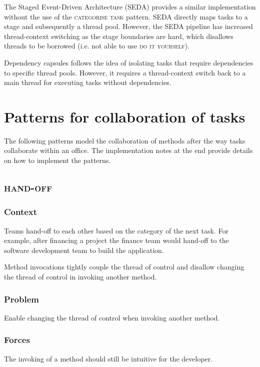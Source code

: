\documentclass[prodmode]{style/acmlarge}
\begin{document}
The Staged Event-Driven Architecture (SEDA) \cite{seda} provides a similar
implementation without the use of the \textsc{categorise task} pattern.
SEDA directly maps tasks to a stage and subsequently a thread pool.
However, the SEDA pipeline has increased thread-context switching as the stage
boundaries are hard, which disallows threads to be borrowed (i.e. not able to
use \textsc{do it yourself}).

Dependency capsules \cite{dependency-capsules} follows the idea of isolating
tasks that require dependencies to specific thread pools.  However, it
requires a thread-context switch back to a main thread for executing tasks
without dependencies.



\section{Patterns for collaboration of tasks}

The following patterns model the collaboration of methods after the way tasks
collaborate within an office.  The implementation notes at the end provide
details on how to implement the patterns.


\subsection{\textsc{\textbf{hand-off}}}

\subsubsection*{Context} Teams hand-off to each other based on the category of
the next task.  For example, after financing a project the finance team would
hand-off to the software development team to build the application.

Method invocations tightly couple the thread of control and disallow changing
the thread of control in invoking another method.

\subsubsection*{Problem} Enable changing the thread of control when invoking
another method.

\subsubsection*{Forces} The invoking of a method should still be intuitive for
the developer.
\end{document}
